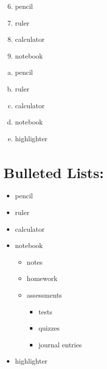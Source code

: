 \documentclass[11pt]{article}
\begin{document}
\vspace{0.5cm}
\begin{enumerate}\setcounter{enumi}{5}
\item pencil
\item ruler
\item calculator
\item notebook
\end{enumerate}

\vspace{0.5cm}
\begin{enumerate}[a)]
\item pencil
\item ruler
\item calculator
\item notebook
\item highlighter
\end{enumerate}

\vspace{0.5cm}
\section{Bulleted Lists:}
\begin{itemize}
\item pencil
\item ruler
\item calculator
\item notebook
	\begin{itemize}
	\item notes
	\item homework
	\item assessments
		\begin{itemize}
		\item tests
		\item quizzes 
		\item journal entries
		\end{itemize}
	\end{itemize}
\item highlighter
\end{itemize}
\end{document}
